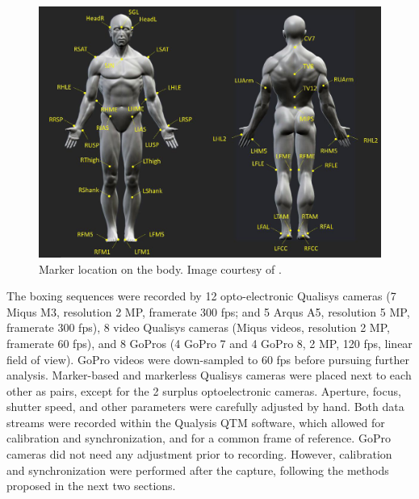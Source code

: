 \begin{figure}[!ht]
	\centering
	\def\svgwidth{1\columnwidth}
	\fontsize{10pt}{10pt}\selectfont
	\includegraphics[width=\linewidth]{"../Chap6/Figures/Fig_MkBoxe.PNG"}
	\caption{Marker location on the body. Image courtesy of \cite{Lahkar2022}.}
	\label{fig_mkboxe}
\end{figure}

The boxing sequences were recorded by 12 opto-electronic Qualisys cameras (7 Miqus M3, resolution 2 MP, framerate 300 fps; and 5 Arqus A5, resolution 5 MP, framerate 300 fps), 8 video Qualisys cameras (Miqus videos, resolution 2 MP, framerate 60 fps), and 8 GoPros (4 GoPro 7 and 4 GoPro 8, 2 MP, 120 fps, linear field of view). GoPro videos were down-sampled to 60 fps before pursuing further analysis. Marker-based and markerless Qualisys cameras were placed next to each other as pairs, except for the 2 surplus optoelectronic cameras. Aperture, focus, shutter speed, and other parameters were carefully adjusted by hand. Both data streams were recorded within the Qualysis QTM software, which allowed for calibration and synchronization, and for a common frame of reference. GoPro cameras did not need any adjustment prior to recording. However, calibration and synchronization were performed after the capture, following the methods proposed in the next two sections. 

